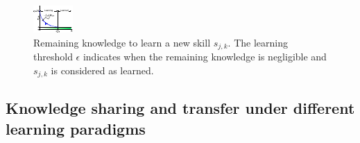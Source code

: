 \begin{figure}[!t]
	\centering
	\includegraphics[width=0.95\columnwidth]{fig/knowledge_idealization.pdf}
	\caption{Remaining knowledge to learn a new skill $s_{j,k}$. The learning threshold $\epsilon$ indicates when the remaining knowledge is negligible and $s_{j,k}$ is considered as learned.}
	\label{fig:knowledge_idealization}
\end{figure}
\subsection{Knowledge sharing and transfer under different learning paradigms}


